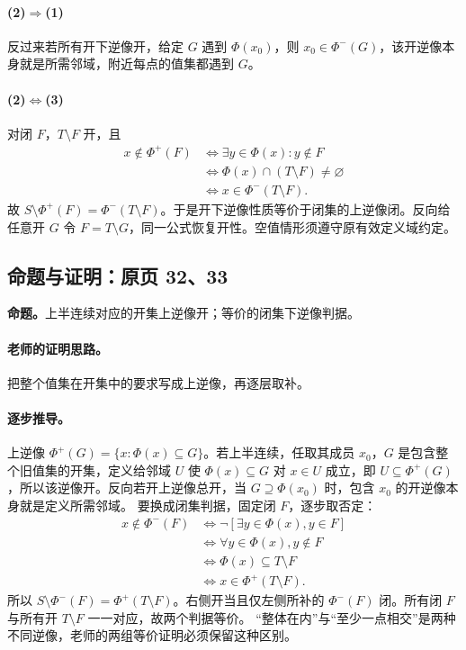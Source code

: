 \documentclass[11pt,a4paper]{article}
\theoremstyle{definition}\newtheorem{definition}{定义}\newtheorem{example}{例}
\begin{document}
\paragraph{(2)$\Rightarrow$(1)}反过来若所有开下逆像开，给定 $G$ 遇到 $\Phi(x_0)$，则 $x_0\in\Phi^-(G)$，该开逆像本身就是所需邻域，附近每点的值集都遇到 $G$。
\paragraph{(2)$\Leftrightarrow$(3)}对闭 $F$，$T\setminus F$ 开，且
\begin{align*}
x\notin\Phi^+(F)&\iff\exists y\in\Phi(x):y\notin F\\
&\iff\Phi(x)\cap(T\setminus F)\ne\varnothing\\
&\iff x\in\Phi^-(T\setminus F).
\end{align*}
故 $S\setminus\Phi^+(F)=\Phi^-(T\setminus F)$。于是开下逆像性质等价于闭集的上逆像闭。反向给任意开 $G$ 令 $F=T\setminus G$，同一公式恢复开性。空值情形须遵守原有效定义域约定。


\subsection{命题与证明：原页 32、33}

\textbf{命题。}上半连续对应的开集上逆像开；等价的闭集下逆像判据。

\paragraph{老师的证明思路。}把整个值集在开集中的要求写成上逆像，再逐层取补。

\paragraph{逐步推导。}
上逆像 $\Phi^+(G)=\{x:\Phi(x)\subseteq G\}$。若上半连续，任取其成员 $x_0$，$G$ 是包含整个旧值集的开集，定义给邻域 $U$ 使 $\Phi(x)\subseteq G$ 对 $x\in U$ 成立，即 $U\subseteq\Phi^+(G)$，所以该逆像开。反向若开上逆像总开，当 $G\supseteq\Phi(x_0)$ 时，包含 $x_0$ 的开逆像本身就是定义所需邻域。
要换成闭集判据，固定闭 $F$，逐步取否定：
\begin{align*}
x\notin\Phi^-(F)&\iff\neg[\exists y\in\Phi(x),y\in F]\\
&\iff\forall y\in\Phi(x),y\notin F\\
&\iff\Phi(x)\subseteq T\setminus F\\
&\iff x\in\Phi^+(T\setminus F).
\end{align*}
所以 $S\setminus\Phi^-(F)=\Phi^+(T\setminus F)$。右侧开当且仅左侧所补的 $\Phi^-(F)$ 闭。所有闭 $F$ 与所有开 $T\setminus F$ 一一对应，故两个判据等价。
“整体在内”与“至少一点相交”是两种不同逆像，老师的两组等价证明必须保留这种区别。
\end{document}
